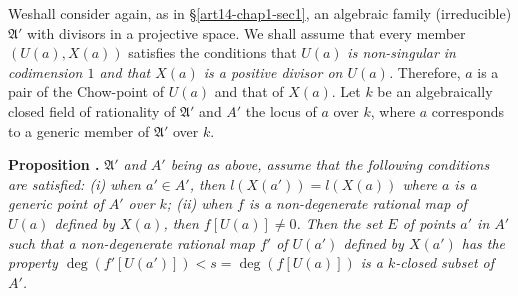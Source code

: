We\pageoriginale shall consider again, as in \S\ref{art14-chap1-sec1}, an algebraic family (irreducible) $\mathfrak{A}'$ with divisors in a projective space. We shall assume that every member $(U(a),X(a))$ satisfies the conditions that $U(a)$ {\em is non-singular in codimension $1$ and that $X(a)$ is a positive divisor on $U(a)$.} Therefore, $a$ is a pair of the Chow-point of $U(a)$ and that of $X(a)$. Let $k$ be an algebraically closed field of rationality of $\mathfrak{A}'$ and $A'$ the locus of $a$ over $k$, where $a$ corresponds to a generic member of $\mathfrak{A}'$ over $k$.

\medskip
\noindent
{\bf Proposition .\label{art14-app-prop2.2}}
{\em $\mathfrak{A}'$ and $A'$ being as above, assume that the following conditions are satisfied: {\rm(i)} when $a'\in A'$, then $l(X(a'))=l(X(a))$ where $a$ is a generic point of $A'$ over $k$; {\rm(ii)} when $f$ is a non-degenerate rational map of $U(a)$ defined by $X(a)$, then $f[U(a)]\neq 0$. Then the set $E$ of points $a'$ in $A'$ such that a non-degenerate rational map $f'$ of $U(a')$ defined by $X(a')$ has the property $\deg (f'[U(a')])<s=\deg (f[U(a)])$ is a $k$-closed subset of $A'$.}


